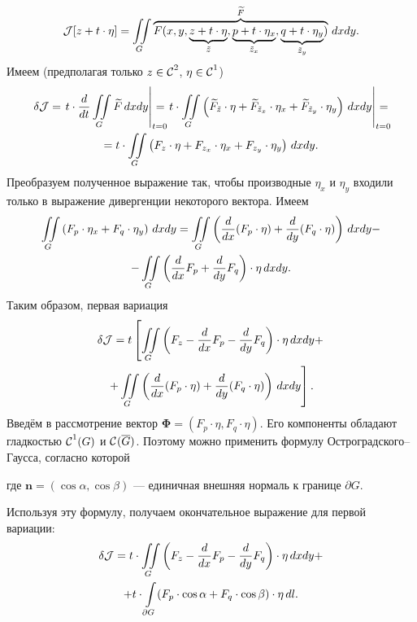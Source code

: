 \begin{equation*}
	\mathcal{J}[z+t\cdot\eta]=\iint\limits_{G}\overbrace{F(x,y,\underbrace{z+t\cdot\eta}_{\tilde{z}},\underbrace{p+t\cdot\eta_x}_{\tilde{z}_x},\underbrace{q+t\cdot\eta_y}_{\tilde{z}_y})}^{\widetilde{F}}\,dxdy.
\end{equation*}
Имеем (предполагая только $z\in\mathcal{C}{\mathstrut}^{2}_{}$, $\eta\in\mathcal{C}{\mathstrut}^{1}_{}$)
\begin{multline*}
	\delta\J=\left.t\cdot\der{}{t}\iint\limits_{G}\widetilde{F}\,dxdy\right|_{\lefteqn{\scriptstyle t=0}}=\left.t\cdot\iint\limits_{G}\left(\widetilde{F}_{\tilde{z}}\cdot\eta+\widetilde{F}_{\tilde{z}_x}\cdot\eta_x+\widetilde{F}_{\tilde{z}_y}\cdot\eta_y\right)\,dxdy\right|_{\lefteqn{\scriptstyle t=0}}=\\=t\cdot\iint\limits_{G}\left({F}_{z}\cdot\eta+{F}_{z_x}\cdot\eta_x+{F}_{z_y}\cdot\eta_y\right)\,dxdy.
\end{multline*}
Преобразуем полученное выражение так, чтобы производные $\eta_x$ и $\eta_y$ входили только в выражение дивергенции некоторого вектора. Имеем
\begin{multline*}
	\iint\limits_{G}\left(F_p\cdot\eta_x+F_q\cdot\eta_y\right)\,dxdy=\iint\limits_{G}\left(\frac{d}{dx}(F_p\cdot\eta)+\frac{d}{dy}(F_q\cdot\eta)\right)\,dxdy-\\-\iint\limits_{G}\left(\frac{d}{dx}F_p+\frac{d}{dy}F_q\right)\cdot\eta\,dxdy.
\end{multline*}
Таким образом, первая вариация
\begin{multline*}
	\delta\mathcal{J}=t\left[\iint\limits_{G}\left(F_z-\frac{d}{dx}F_p-\frac{d}{dy}F_q\right)\cdot\eta\,dxdy+\right.\\\left.+\iint\limits_{G}\left(\frac{d}{dx}(F_p\cdot\eta)+\frac{d}{dy}(F_q\cdot\eta)\right)\,dxdy\right].
\end{multline*}
Введём в рассмотрение вектор $\bm{\Phi}=(F_p\cdot\eta,F_q\cdot\eta)$. Его компоненты обладают гладкостью $\mathcal{C}{\mathstrut}^{1}_{}(G)$ и $\mathcal{C}{\mathstrut}^{}_{}(\overline{G})$. Поэтому можно применить формулу Остроградского--Гаусса, согласно которой
\begin{center}
\end{center}
где $\bm{n}=(\cos\alpha,\cos\beta)$ --- единичная внешняя нормаль к границе $\partial G$.

\noindent Используя эту формулу{\mb,} получаем окончательное выражение для первой вариации{\mb:}
\begin{multline}\label{l9:eq:10}
	\delta\mathcal{J}=t\cdot\iint\limits_{G}\left(F_z-\frac{d}{dx}F_p-\frac{d}{dy}F_q\right)\cdot\eta\,dxdy+\\+t\cdot\int\limits_{\partial G}(F_p\cdot\cos\alpha+F_q\cdot\cos\beta)\cdot\eta\,dl.
\end{multline}


